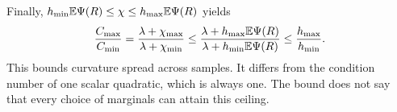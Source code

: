 Finally, $h_{\min}\mathbb E\Psi(R)\leq\chi\leq h_{\max}\mathbb E\Psi(R)$ yields
\[
 \frac{C_{\max}}{C_{\min}}
 =\frac{\lambda+\chi_{\max}}{\lambda+\chi_{\min}}
 \leq\frac{\lambda+h_{\max}\mathbb E\Psi(R)}
             {\lambda+h_{\min}\mathbb E\Psi(R)}
 \leq\frac{h_{\max}}{h_{\min}}.
\]
This bounds curvature spread across samples. It differs from the condition
number of one scalar quadratic, which is always one. The bound does not
say that every choice of marginals can attain this ceiling.
